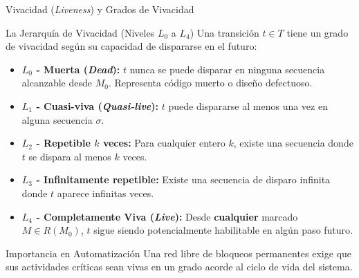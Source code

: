 \documentclass[10pt, aspectratio=169]{beamer}
\begin{document}
\begin{frame}{Vivacidad (\emph{Liveness}) y Grados de Vivacidad}
	\begin{block}{La Jerarquía de Vivacidad (Niveles $L_0$ a $L_4$)}
		Una transición $t \in T$ tiene un grado de vivacidad según su capacidad de dispararse en el futuro:
		\begin{itemize}
			\item \textbf{$L_0$ - Muerta (\emph{Dead}):} $t$ nunca se puede disparar en ninguna secuencia alcanzable desde $M_0$. Representa \alert{código muerto o diseño defectuoso}.
			\item \textbf{$L_1$ - Cuasi-viva (\emph{Quasi-live}):} $t$ puede dispararse al menos una vez en alguna secuencia $\sigma$.
			\item \textbf{$L_2$ - Repetible $k$ veces:} Para cualquier entero $k$, existe una secuencia donde $t$ se dispara al menos $k$ veces.
			\item \textbf{$L_3$ - Infinitamente repetible:} Existe una secuencia de disparo infinita donde $t$ aparece infinitas veces.
			\item \textbf{$L_4$ - Completamente Viva (\emph{Live}):} Desde \textbf{cualquier} marcado $M \in R(M_0)$, $t$ sigue siendo potencialmente habilitable en algún paso futuro.
		\end{itemize}
	\end{block}

	\begin{alertblock}{Importancia en Automatización}
		Una red libre de bloqueos permanentes exige que sus actividades críticas sean vivas en un grado acorde al ciclo de vida del sistema.
	\end{alertblock}
\end{frame}
\end{document}
